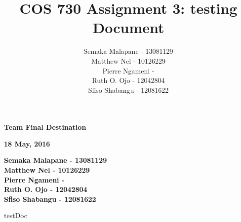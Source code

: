 \documentclass[a4paper]{article}
\title{COS 730 Assignment 3: testing Document}
\author{Semaka Malapane -  13081129 \\
		Matthew Nel -  10126229\\
		Pierre Ngameni -  \\
		Ruth O. Ojo - 12042804 \\
		Sfiso Shabangu - 12081622 }
\begin{document}
	


\begin{titlepage}
    \begin{center}
        \vspace*{1.5cm}        
        \Huge
        \textbf{Team Final Destination}

        \vspace{1.5cm}        
        \large
        \textbf{18 May, 2016}
        
        \vspace{1.0cm}
        
		\large       
	        \textbf{Semaka Malapane -  13081129}\\
			\textbf{Matthew Nel - 10126229} \\
			\textbf{Pierre Ngameni -  }\\
			\textbf{Ruth O. Ojo - 12042804 }\\
			\textbf{Sfiso Shabangu - 12081622}        
        
        
    \end{center}
\end{titlepage}


\pagebreak
\tableofcontents
\pagebreak

{testDoc}



\end{document}
